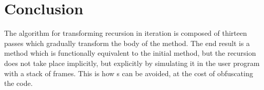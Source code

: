 \chapter{Conclusion}

The algorithm for transforming recursion in iteration is composed of thirteen passes which gradually transform the body
of the method. The end result is a method which is functionally equivalent to the initial method, but the recursion does
not take place implicitly, but explicitly by simulating it in the user program with a stack of frames. This is how
s can be avoided, at the cost of obfuscating the code.